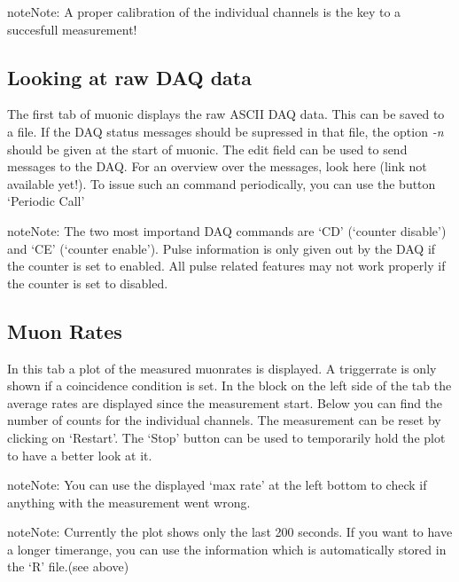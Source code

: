 \documentclass[letterpaper,10pt,english]{sphinxmanual}
\begin{document}
\begin{notice}{note}{Note:}
A proper calibration of the individual channels is the key to a succesfull measurement!
\end{notice}


\subsection{Looking at raw DAQ data}
\label{tutorial:looking-at-raw-daq-data}
The first tab of muonic displays the raw ASCII DAQ data.
This can be saved to a file. If the DAQ status messages should be supressed in that file, the option \emph{-n} should be given at the start of muonic.
The edit field can be used to send messages to the DAQ. For an overview over the messages, look here (link not available yet!).
To issue such an command periodically, you can use the button `Periodic Call'

\begin{notice}{note}{Note:}
The two most importand DAQ commands are `CD' (`counter disable') and `CE' (`counter enable'). Pulse information is only given out by the DAQ if the counter is set to enabled. All pulse related features may not work properly if the counter is set to disabled.
\end{notice}


\subsection{Muon Rates}
\label{tutorial:muon-rates}
In this tab a plot of the measured muonrates is displayed. A triggerrate is only shown if a coincidence condition is set.
In the block on the left side of the tab the average rates are displayed since the measurement start. Below you can find the number of counts for the individual channels. The measurement can be reset by clicking on `Restart'. The `Stop' button can be used to temporarily hold the plot to have a better look at it.

\begin{notice}{note}{Note:}
You can use the displayed `max rate' at the left bottom to check if anything with the measurement went wrong.
\end{notice}

\begin{notice}{note}{Note:}
Currently the plot shows only the last 200 seconds. If you want to have a longer timerange, you can use the information which is automatically stored in the `R' file.(see above)
\end{notice}
\end{document}
